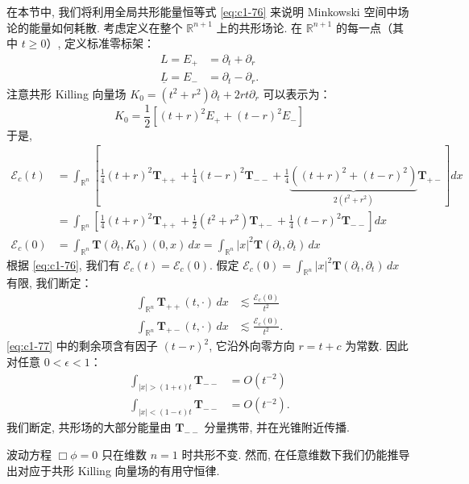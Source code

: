 在本节中, 我们将利用全局共形能量恒等式 \eqref{eq:c1-76} 来说明 Minkowski 空间中场论的能量如何耗散. 考虑定义在整个 $\mathbb{R}^{n+1}$ 上的共形场论. 在 $\mathbb{R}^{n+1}$ 的每一点（其中 $t \geq 0$）, 定义标准零标架：
\[
\begin{aligned}
L = E_+ &= \partial_t + \partial_r\\
\underline{L} = E_- &= \partial_t - \partial_r.
\end{aligned}
\]
注意共形 Killing 向量场 $K_0 = (t^2+r^2)\partial_t + 2rt\partial_r$ 可以表示为：
\[
K_0 = \frac{1}{2}\left[(t+r)^2E_+ + (t-r)^2E_-\right]
\]
于是, 
\begin{equation}
\begin{aligned}
\mathcal{E}_c(t) &= \int_{\mathbb{R}^n}\left[\frac{1}{4}(t+r)^2\mathbf{T}_{++} + \frac{1}{4}(t-r)^2\mathbf{T}_{--} + \frac{1}{4}\underbrace{\left((t+r)^2+(t-r)^2\right)}_{2(t^2+r^2)}\mathbf{T}_{+-}\right]dx\\
&= \int_{\mathbb{R}^n}\left[\frac{1}{4}(t+r)^2\mathbf{T}_{++} + \frac{1}{2}(t^2+r^2)\mathbf{T}_{+-} + \frac{1}{4}(t-r)^2\mathbf{T}_{--}\right]dx\\
\mathcal{E}_c(0) &= \int_{\mathbb{R}^n}\mathbf{T}(\partial_t, K_0)(0, x)\, dx = \int_{\mathbb{R}^n}|x|^2\mathbf{T}(\partial_t, \partial_t)\, dx
\end{aligned}\label{eq:c1-77}
\end{equation}
根据 \eqref{eq:c1-76}, 我们有 $\mathcal{E}_c(t) = \mathcal{E}_c(0)$. 假定 $\mathcal{E}_c(0) = \int_{\mathbb{R}^n}|x|^2\mathbf{T}(\partial_t, \partial_t)\, dx$ 有限, 我们断定：
\[
\begin{aligned}
\int_{\mathbb{R}^n}\mathbf{T}_{++}(t, \cdot)\, dx &\lesssim \frac{\mathcal{E}_c(0)}{t^2}\\
\int_{\mathbb{R}^n}\mathbf{T}_{+-}(t, \cdot)\, dx &\lesssim \frac{\mathcal{E}_c(0)}{t^2}.
\end{aligned}
\]
\eqref{eq:c1-77} 中的剩余项含有因子 $(t-r)^2$, 它沿外向零方向 $r = t + c$ 为常数. 因此对任意 $0 < \epsilon < 1$：
\[
\begin{aligned}
\int_{|x|>(1+\epsilon)t}\mathbf{T}_{--} &= O(t^{-2})\\
\int_{|x|<(1-\epsilon)t}\mathbf{T}_{--} &= O(t^{-2}).
\end{aligned}
\]
我们断定, 共形场的大部分能量由 $\mathbf{T}_{--}$ 分量携带, 并在光锥附近传播. 

波动方程 $\Box\phi = 0$ 只在维数 $n = 1$ 时共形不变. 然而, 在任意维数下我们仍能推导出对应于共形 Killing 向量场的有用守恒律. 

